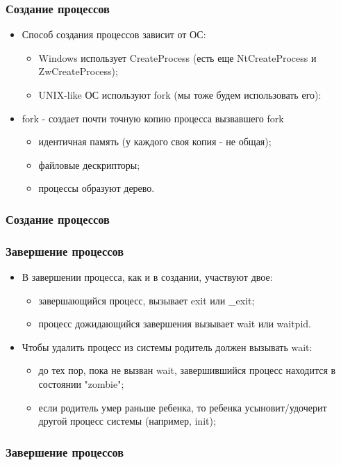 \begin{frame}
\frametitle{Создание процессов}

\begin{itemize}
  \item<1-> Способ создания процессов зависит от ОС:
    \begin{itemize}
      \item Windows использует CreateProcess (есть еще NtCreateProcess и ZwCreateProcess);
      \item UNIX-like ОС используют fork (мы тоже будем использовать его):
    \end{itemize}
  \item<2-> fork - создает почти точную копию процесса вызвавшего fork
    \begin{itemize}
      \item идентичная память (у каждого своя копия - не общая);
      \item файловые дескрипторы;
      \item процессы образуют дерево.
    \end{itemize}
\end{itemize}
\end{frame}

\begin{frame}[fragile]
\frametitle{Создание процессов}

\end{frame}

\begin{frame}
\frametitle{Завершение процессов}

\begin{itemize}
  \item<1-> В завершении процесса, как и в создании, участвуют двое:
    \begin{itemize}
      \item завершающийся процесс, вызывает exit или \_exit;
      \item процесс дожидающийся завершения вызывает wait или waitpid.
    \end{itemize}
  \item<2-> Чтобы удалить процесс из системы родитель должен вызывать wait:
    \begin{itemize}
      \item до тех пор, пока не вызван wait, завершившийся процесс находится в состоянии "zombie";
      \item если родитель умер раньше ребенка, то ребенка усыновит/удочерит другой процесс системы (например, init);
    \end{itemize}
\end{itemize}
\end{frame}

\begin{frame}[fragile]
\frametitle{Завершение процессов}

\end{frame}
